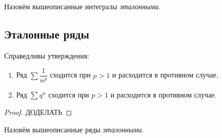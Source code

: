\begin{remark}
	Назовём вышеописанные интегралы \textit{эталонными}.
\end{remark}

\subsection{Эталонные ряды}

\begin{lemma}
	Справедливы утверждения:
	\begin{enumerate}
		\item Ряд  \(\sum \dfrac{1}{n^p}\) сходится при \(p > 1\) и расходится в противном случае,
		\item Ряд \(\sum q^n\) сходится при \(p > 1\) и расходится в противном случае.
	\end{enumerate}
\end{lemma}
\begin{proof}
	ДОДЕЛАТЬ
\end{proof}

\begin{remark}
	Назовём вышеописанные ряды \textit{эталонными}.
\end{remark}